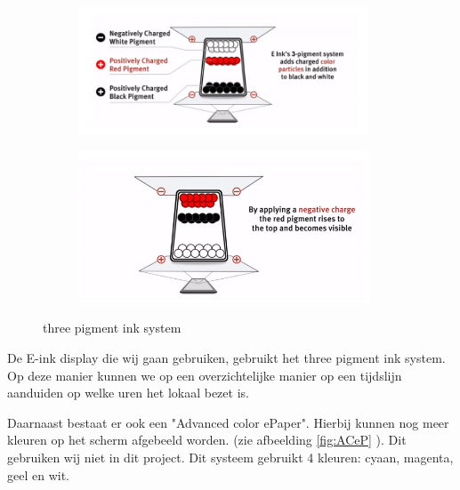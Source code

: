 \documentclass[a4paper,kul]{kulakarticle} %
\begin{document}
\begin{figure}[h]
	\centering
	\begin{subfigure}{.5\textwidth}
		\centering
		\includegraphics[width=0.95\textwidth]{three_pigment_ink_system1}
		\label{fig:sub3psystem}
	\end{subfigure}%
	\begin{subfigure}{.5\textwidth}
		\centering
		\includegraphics[width=0.95\textwidth]{three_pigment_ink_system2}
		\label{fig:sub3psystem2}
	\end{subfigure}
	\caption{three pigment ink system}
	\label{fig:3psystem}
\end{figure}

De E-ink display die wij gaan gebruiken, gebruikt het three pigment ink system. Op deze manier kunnen we op een overzichtelijke manier op een tijdslijn aanduiden op welke uren het lokaal bezet is.
\newline

Daarnaast bestaat er ook een "Advanced color ePaper". Hierbij kunnen nog meer kleuren op het scherm afgebeeld worden. (zie afbeelding \ref{fig:ACeP} ). Dit gebruiken wij niet in dit project. Dit systeem gebruikt 4 kleuren: cyaan, magenta, geel en wit.  \newline
\end{document}
